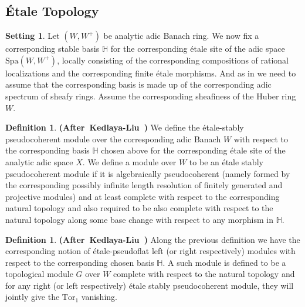 \documentclass[12pt]{amsart}
\theoremstyle{definition}
\newtheorem{definition}[theorem]{Definition}
\numberwithin{equation}{section}
\newtheorem{setting}[theorem]{Setting}
\begin{document}
\subsection{\'Etale Topology}

\begin{setting}
Let $(W,W^+)$ be analytic adic Banach ring. We now fix a corresponding stable basis $\mathbb{H}$ for the corresponding \'etale site of the adic space $\mathrm{Spa}(W,W^+)$, locally consisting of the corresponding compositions of rational localizations and the corresponding finite \'etale morphisms. And as in \cite[Hypothesis 1.10.3]{Ked1} we need to assume that the corresponding basis is made up of the corresponding adic spectrum of sheafy rings. Assume the corresponding sheafiness of the Huber ring $W$.
\end{setting}





\begin{definition} \mbox{\bf{(After Kedlaya-Liu \cite[Definition 2.5.9]{KL2})}}
We define the \'etale-stably pseudocoherent module over the corresponding adic Banach $W$ with respect to the corresponding basis $\mathbb{H}$ chosen above for the corresponding \'etale site of the analytic adic space $X$. We define a module over $W$ to be an \'etale stably pseudocoherent module if it is algebraically pseudocoherent (namely formed by the corresponding possibly infinite length resolution of finitely generated and projective modules) and at least complete with respect to the corresponding natural topology and also required to be also complete with respect to the natural topology along some base change with respect to any morphism in $\mathbb{H}$.
\end{definition}




\begin{definition} \mbox{\bf{(After Kedlaya-Liu \cite[Definition 2.5.9]{KL2})}}
Along the previous definition we have the corresponding notion of \'etale-pseudoflat left (or right respectively) modules with respect to the corresponding chosen basis $\mathbb{H}$. A such module is defined to be a topological module $G$ over $W$ complete with respect to the natural topology and for any right (or left respectively) \'etale stably pseudocoherent module, they will jointly give the $\mathrm{Tor}_1$ vanishing.
\end{definition}
\end{document}
